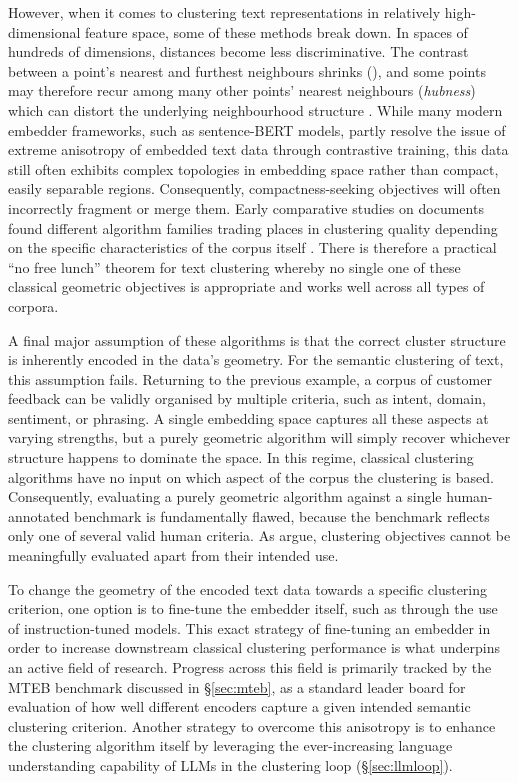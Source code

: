 \documentclass[11pt,a4paper,oneside]{report}
\begin{document}
However, when it comes to clustering text representations in relatively high-dimensional feature space, some of these methods break down. In spaces of hundreds of dimensions, distances become less discriminative. The contrast between a point's nearest and furthest neighbours shrinks (\citealp{beyer1999nearest,aggarwal2001surprising}), and some points may therefore recur among many other points' nearest neighbours (\emph{hubness}) which can distort the underlying neighbourhood structure \citep{radovanovic2010hubs}. While many modern embedder frameworks, such as sentence-BERT models, partly resolve the issue of extreme anisotropy of embedded text data through contrastive training, this data still often exhibits complex topologies in embedding space rather than compact, easily separable regions. Consequently, compactness-seeking objectives will often incorrectly fragment or merge them. Early comparative studies on documents found different algorithm families trading places in clustering quality depending on the specific characteristics of the corpus itself \citep{steinbach2000comparison}. There is therefore a practical ``no free lunch'' theorem for text clustering whereby no single one of these classical geometric objectives is appropriate and works well across all types of corpora.

A final major assumption of these algorithms is that the correct cluster structure is inherently encoded in the data's geometry. For the semantic clustering of text, this assumption fails. Returning to the previous example, a corpus of customer feedback can be validly organised by multiple criteria, such as intent, domain, sentiment, or phrasing. A single embedding space captures all these aspects at varying strengths, but a purely geometric algorithm will simply recover whichever structure happens to dominate the space. In this regime, classical clustering algorithms have no input on which aspect of the corpus the clustering is based. Consequently, evaluating a purely geometric algorithm against a single human-annotated benchmark is fundamentally flawed, because the benchmark reflects only one of several valid human criteria. As \citet{vonluxburg2012science} argue, clustering objectives cannot be meaningfully evaluated apart from their intended use.

To change the geometry of the encoded text data towards a specific clustering criterion, one option is to fine-tune the embedder itself, such as through the use of instruction-tuned models. This exact strategy of fine-tuning an embedder in order to increase downstream classical clustering performance is what underpins an active field of research. Progress across this field is primarily tracked by the MTEB benchmark discussed in \S\ref{sec:mteb}, as a standard leader board for evaluation of how well different encoders capture a given intended semantic clustering criterion. Another strategy to overcome this anisotropy is to enhance the clustering algorithm itself by leveraging the ever-increasing language understanding capability of LLMs in the clustering loop (\S\ref{sec:llmloop}).
\end{document}
